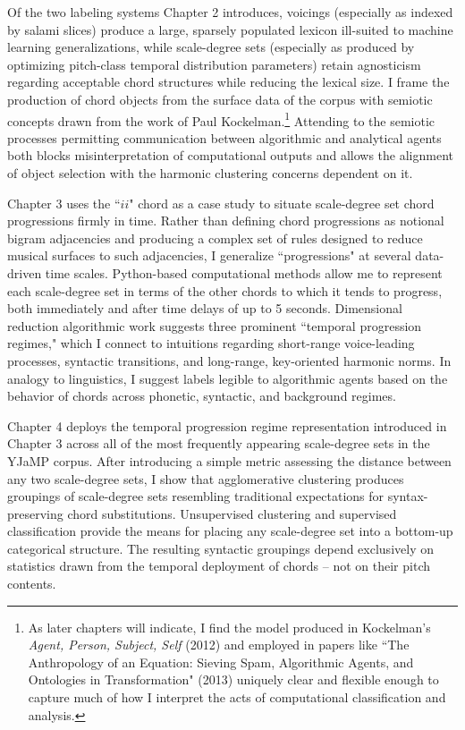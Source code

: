 Of the two labeling systems Chapter 2 introduces, voicings (especially as indexed by salami slices) produce a large, sparsely populated lexicon ill-suited to machine learning generalizations, while scale-degree sets (especially as produced by optimizing pitch-class temporal distribution parameters) retain agnosticism regarding acceptable chord structures while reducing the lexical size.  I frame the production of chord objects from the surface data of the corpus with semiotic concepts drawn from the work of Paul Kockelman.\footnote{As later chapters will indicate, I find the model produced in Kockelman's \emph{Agent, Person, Subject, Self} (2012) and employed in papers like ``The Anthropology of an Equation: Sieving Spam, Algorithmic Agents, and Ontologies in Transformation" (2013) uniquely clear and flexible enough to capture much of how I interpret the acts of computational classification and analysis.}  Attending to the semiotic processes permitting communication between algorithmic and analytical agents both blocks misinterpretation of computational outputs and allows the alignment of object selection with the harmonic clustering concerns dependent on it.

Chapter 3 uses the ``$ii$" chord as a case study to situate scale-degree set chord progressions firmly in time.  Rather than defining chord progressions as notional bigram adjacencies and producing a complex set of rules designed to reduce musical surfaces to such adjacencies, I generalize ``progressions" at several data-driven time scales.  Python-based computational methods allow me to represent each scale-degree set in terms of the other chords to which it tends to progress, both immediately and after time delays of up to 5 seconds.  Dimensional reduction algorithmic work suggests three prominent ``temporal progression regimes," which I connect to intuitions regarding short-range voice-leading processes, syntactic transitions, and long-range, key-oriented harmonic norms.  In analogy to linguistics, I suggest labels legible to algorithmic agents based on the behavior of chords across phonetic, syntactic, and background regimes.

Chapter 4 deploys the temporal progression regime representation introduced in Chapter 3 across all of the most frequently appearing scale-degree sets in the YJaMP corpus.  After introducing a simple metric assessing the distance between any two scale-degree sets, I show that agglomerative clustering produces groupings of scale-degree sets resembling traditional expectations for syntax-preserving chord substitutions.  Unsupervised clustering and supervised classification provide the means for placing any scale-degree set into a bottom-up categorical structure.  The resulting syntactic groupings depend exclusively on statistics drawn from the temporal deployment of chords -- not on their pitch contents.

